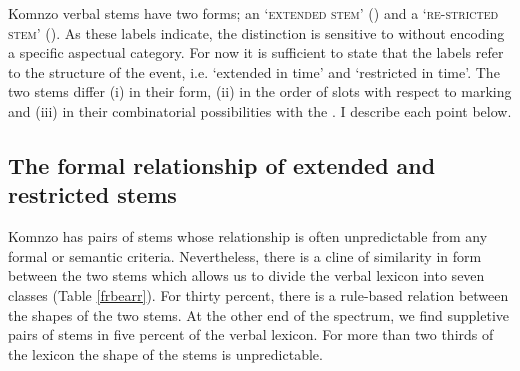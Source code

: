 Komnzo verbal stems have two forms; an `\textsc{extended stem}' (\Ext) and a `\textsc{re-stricted stem}' (\Rs). As these labels indicate, the distinction is sensitive to  without encoding a specific aspectual category. For now it is sufficient to state that the labels refer to the  structure of the event, i.e. `extended in time' and `restricted in time'. The two stems differ (i) in their form, (ii) in the order of slots with respect to  marking and (iii) in their combinatorial possibilities with the . I describe each point below.

\subsection{The formal relationship of extended and restricted stems} \label{formalrelationshipextrs}

Komnzo has pairs of  stems whose relationship is often unpredictable from any formal or semantic criteria. Nevertheless, there is a cline of similarity in form between the two stems which allows us to divide the verbal lexicon into seven classes (Table \ref{frbearr}). For thirty percent, there is a rule-based relation between the shapes of the two stems. At the other end of the spectrum, we find suppletive pairs of stems in five percent of the verbal lexicon. For more than two thirds of the lexicon the shape of the stems is unpredictable.\\

